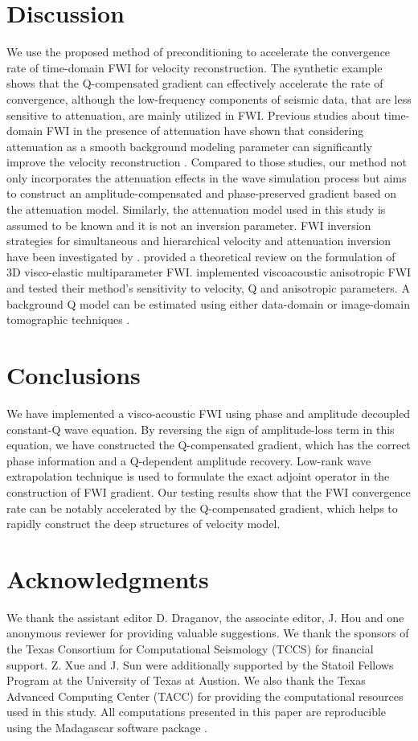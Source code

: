 \section{Discussion}
We use the proposed method of preconditioning to accelerate the convergence rate of time-domain FWI for velocity reconstruction.
The synthetic example shows that the Q-compensated gradient can effectively accelerate the rate of convergence,
although the low-frequency components of seismic data, that are less sensitive to attenuation, are mainly utilized in FWI.
Previous studies about time-domain FWI in the presence of attenuation have shown that considering attenuation as a smooth background modeling parameter can significantly improve the velocity reconstruction \cite[]{kurzmann13,bai14}.
Compared to those studies, our method not only incorporates the attenuation effects in the wave simulation process but aims to construct an amplitude-compensated and phase-preserved gradient based on the attenuation model.
Similarly, the attenuation model used in this study is assumed to be known and it is not an inversion parameter.
FWI inversion strategies for simultaneous and hierarchical velocity and attenuation inversion have been investigated by \cite{kamei13}.
\cite{yang16} provided a theoretical review on the formulation of 3D visco-elastic multiparameter FWI.
\cite{qu17} implemented viscoacoustic anisotropic FWI and tested their method's sensitivity to velocity, Q and anisotropic parameters.
A background Q model can be estimated using either data-domain or image-domain tomographic techniques \cite[]{brzostowski92,quan97,hu11,zhou11,valenciano12,shen14,shen15b,shen15a,dutta16}.

\section{Conclusions}
We have implemented a visco-acoustic FWI using phase and amplitude decoupled constant-Q wave equation.
By reversing the sign of amplitude-loss term in this equation, we have constructed the Q-compensated gradient, which has the correct phase information and a Q-dependent amplitude recovery.
Low-rank wave extrapolation technique is used to formulate the exact adjoint operator in the construction of FWI gradient.
Our testing results show that the FWI convergence rate can be notably accelerated by the Q-compensated gradient, which helps to rapidly construct the deep structures of velocity model.

\section{Acknowledgments}
We thank the assistant editor D. Draganov, the associate editor, J. Hou and one anonymous reviewer for providing valuable suggestions.
We thank the sponsors of the Texas Consortium for Computational Seismology (TCCS) for financial support.
Z. Xue and J. Sun were additionally supported by the Statoil Fellows Program at the University of Texas at Austion.
We also thank the Texas Advanced Computing Center (TACC) for providing the computational resources used in this study.
All computations presented in this paper are reproducible using the Madagascar software package \cite[]{fomel13b}.



